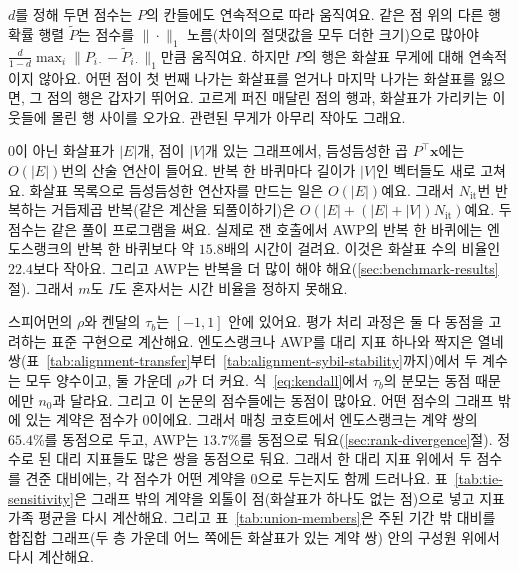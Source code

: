 $d$를 정해 두면 점수는 $P$의 칸들에도 연속적으로 따라 움직여요. 같은 점 위의 다른 행 확률 행렬 $\tilde P$는 점수를 $\|\cdot\|_1$ 노름(차이의 절댓값을 모두 더한 크기)으로 많아야 $\frac{d}{1-d}\max_i\|P_{i\cdot}-\tilde P_{i\cdot}\|_1$만큼 움직여요\parencite{langville2006pagerank}. 하지만 $P$의 행은 화살표 무게에 대해 연속적이지 않아요. 어떤 점이 첫 번째 나가는 화살표를 얻거나 마지막 나가는 화살표를 잃으면, 그 점의 행은 갑자기 뛰어요. 고르게 퍼진 매달린 점의 행과, 화살표가 가리키는 이웃들에 몰린 행 사이를 오가요. 관련된 무게가 아무리 작아도 그래요.\label{sec:pr-continuity}


0이 아닌 화살표가 $|E|$개, 점이 $|V|$개 있는 그래프에서, 듬성듬성한 곱 $P^{\top}\mathbf{x}$에는 $O(|E|)$번의 산술 연산이 들어요. 반복 한 바퀴마다 길이가 $|V|$인 벡터들도 새로 고쳐요. 화살표 목록으로 듬성듬성한 연산자를 만드는 일은 $O(|E|)$예요. 그래서 $N_{\mathrm{it}}$번 반복하는 거듭제곱 반복(같은 계산을 되풀이하기)은 $O(|E|+(|E|+|V|)N_{\mathrm{it}})$예요. 두 점수는 같은 풀이 프로그램을 써요. 실제로 잰 호출에서 AWP의 반복 한 바퀴에는 엔도스랭크의 반복 한 바퀴보다 약 $15.8$배의 시간이 걸려요. 이것은 화살표 수의 비율인 $22.4$보다 작아요. 그리고 AWP는 반복을 더 많이 해야 해요(\ref{sec:benchmark-results}절). 그래서 $m$도 $I$도 혼자서는 시간 비율을 정하지 못해요.

\label{sec:spearman-properties}

스피어먼의 $\rho$와 켄달의 $\tau_b$는 $[-1,1]$ 안에 있어요. 평가 처리 과정은 둘 다 동점을 고려하는 표준 구현으로 계산해요. 엔도스랭크나 AWP를 대리 지표 하나와 짝지은 열네 쌍(표~\ref{tab:alignment-transfer}부터~\ref{tab:alignment-sybil-stability}까지)에서 두 계수는 모두 양수이고, 둘 가운데 $\rho$가 더 커요. 식~\eqref{eq:kendall}에서 $\tau_b$의 분모는 동점 때문에만 $n_0$과 달라요. 그리고 이 논문의 점수들에는 동점이 많아요. 어떤 점수의 그래프 밖에 있는 계약은 점수가 0이에요. 그래서 매칭 코호트에서 엔도스랭크는 계약 쌍의 $65.4\%$를 동점으로 두고, AWP는 $13.7\%$를 동점으로 둬요(\ref{sec:rank-divergence}절). 정수로 된 대리 지표들도 많은 쌍을 동점으로 둬요. 그래서 한 대리 지표 위에서 두 점수를 견준 대비에는, 각 점수가 어떤 계약을 0으로 두는지도 함께 드러나요. 표~\ref{tab:tie-sensitivity}은 그래프 밖의 계약을 외톨이 점(화살표가 하나도 없는 점)으로 넣고 지표 가족 평균을 다시 계산해요. 그리고 표~\ref{tab:union-members}은 주된 기간 밖 대비를 합집합 그래프(두 층 가운데 어느 쪽에든 화살표가 있는 계약 쌍) 안의 구성원 위에서 다시 계산해요.
